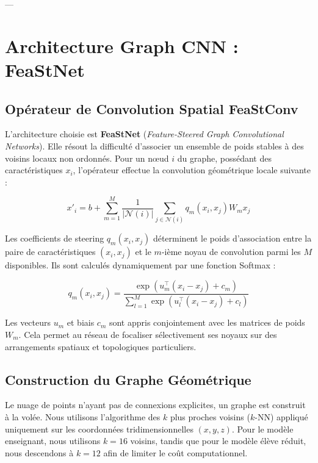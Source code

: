 \documentclass[11pt,a4paper]{article}
\begin{document}
---

\section{Architecture Graph CNN : FeaStNet}

\subsection{Opérateur de Convolution Spatial FeaStConv}
L'architecture choisie est \textbf{FeaStNet} (\textit{Feature-Steered Graph Convolutional Networks}). Elle résout la difficulté d'associer un ensemble de poids stables à des voisins locaux non ordonnés. Pour un nœud $i$ du graphe, possédant des caractéristiques $x_i$, l'opérateur effectue la convolution géométrique locale suivante :

\begin{equation}
x'_i = b + \sum_{m=1}^{M} \frac{1}{|\mathcal{N}(i)|} \sum_{j \in \mathcal{N}(i)} q_m(x_i, x_j) W_m x_j
\end{equation}

Les coefficients de steering $q_m(x_i, x_j)$ déterminent le poids d'association entre la paire de caractéristiques $(x_i, x_j)$ et le $m$-ième noyau de convolution parmi les $M$ disponibles. Ils sont calculés dynamiquement par une fonction Softmax :

\begin{equation}
q_m(x_i, x_j) = \frac{\exp(u_m^\top (x_i - x_j) + c_m)}{\sum_{l=1}^{M} \exp(u_l^\top (x_i - x_j) + c_l)}
\end{equation}

Les vecteurs $u_m$ et biais $c_m$ sont appris conjointement avec les matrices de poids $W_m$. Cela permet au réseau de focaliser sélectivement ses noyaux sur des arrangements spatiaux et topologiques particuliers.

\subsection{Construction du Graphe Géométrique}
Le nuage de points n'ayant pas de connexions explicites, un graphe est construit à la volée. Nous utilisons l'algorithme des $k$ plus proches voisins ($k$-NN) appliqué uniquement sur les coordonnées tridimensionnelles $(x,y,z)$. Pour le modèle enseignant, nous utilisons $k = 16$ voisins, tandis que pour le modèle élève réduit, nous descendons à $k = 12$ afin de limiter le coût computationnel.
\end{document}
